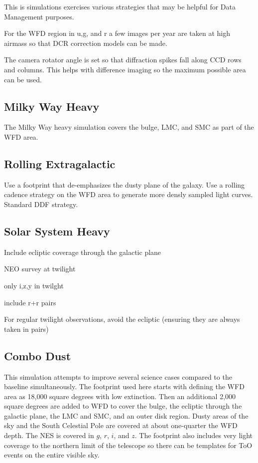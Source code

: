 This is simulations exercises various strategies that may be helpful for Data Management purposes. 

For the WFD region in u,g, and r a few images per year are taken at high airmass so that DCR correction models can be made.

The camera rotator angle is set so that diffraction spikes fall along CCD rows and columns. This helps with difference imaging so the maximum possible area can be used.

\subsection{Milky Way Heavy}

The Milky Way heavy simulation covers the bulge, LMC, and SMC as part of the WFD area.  

\subsection{Rolling Extragalactic}

Use a footprint that de-emphasizes the dusty plane of the galaxy. Use a rolling cadence strategy on the WFD area to generate more densly sampled light curves. Standard DDF strategy.

\subsection{Solar System Heavy}

Include ecliptic coverage through the galactic plane

NEO survey at twilight

only i,z,y in twilght

include r+r pairs

For regular twilight observations, avoid the ecliptic (ensuring they are always taken in pairs)

\subsection{Combo Dust}

This simulation attempts to improve several science cases compared to the baseline simultaneously. The footprint used here starts with defining the WFD area as 18,000 square degrees with low extinction. Then an additional 2,000 square degrees are added to WFD to cover the bulge, the ecliptic through the galactic plane, the LMC and SMC, and an outer disk region. Dusty areas of the sky and the South Celestial Pole are covered at about one-quarter the WFD depth. The NES is covered in $g$, $r$, $i$, and $z$. The footprint also includes very light coverage to the northern limit of the telescope so there can be templates for ToO events on the entire visible sky. 


